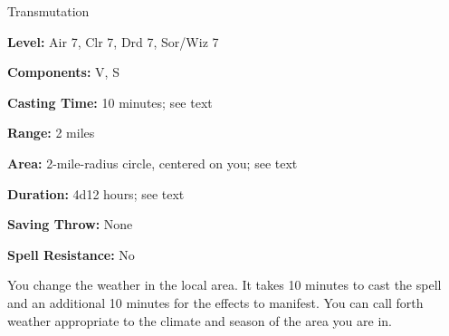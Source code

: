 
Transmutation

\textbf{Level:} Air 7, Clr 7, Drd 7, Sor/Wiz 7

\textbf{Components:} V, S

\textbf{Casting Time:} 10 minutes; see text

\textbf{Range:} 2 miles

\textbf{Area:} 2-mile-radius circle, centered on you; see text

\textbf{Duration:} 4d12 hours; see text

\textbf{Saving Throw:} None

\textbf{Spell Resistance:} No

You change the weather in the local area. It takes 10 minutes to cast the spell 
and an additional 10 minutes for the effects to manifest. You can call 
forth weather appropriate to the climate and season of the area you are in.


